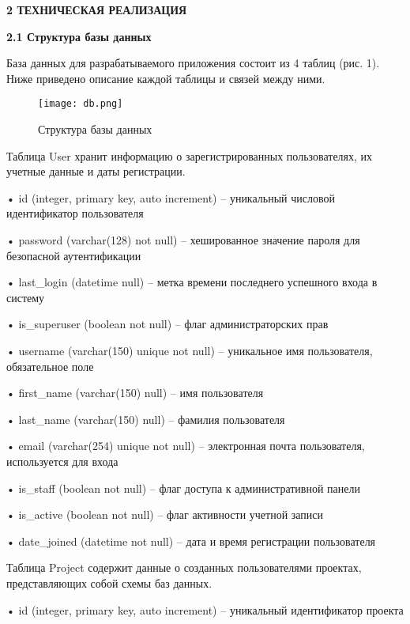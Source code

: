 \newpage
\begin{center}
  \textbf{\large 2 ТЕХНИЧЕСКАЯ РЕАЛИЗАЦИЯ}
\end{center}


\textbf{\large 2.1 Структура базы данных}

База данных для разрабатываемого приложения состоит из 4 таблиц (рис. 1). Ниже приведено описание каждой таблицы и связей между ними.

\renewcommand{\figurename}{Рисунок}
\begin{figure}[htbp]
    \centering %
    \texttt{[image: db.png]} 
    \caption{Структура базы данных}
    \label{fig:analyze} %
\end{figure}

Таблица User хранит информацию о зарегистрированных пользователях, их учетные данные и даты регистрации.

• id (integer, primary key, auto increment) – уникальный числовой идентификатор пользователя

• password (varchar(128) not null) – хешированное значение пароля для безопасной аутентификации

• last\_login (datetime null) – метка времени последнего успешного входа в систему

• is\_superuser (boolean not null) – флаг администраторских прав

• username (varchar(150) unique not null) – уникальное имя пользователя, обязательное поле

• first\_name (varchar(150) null) – имя пользователя

• last\_name (varchar(150) null) – фамилия пользователя

• email (varchar(254) unique not null) – электронная почта пользователя, используется для входа

• is\_staff (boolean not null) – флаг доступа к административной панели

• is\_active (boolean not null) – флаг активности учетной записи

• date\_joined (datetime not null) – дата и время регистрации пользователя


Таблица Project содержит данные о созданных пользователями проектах, представляющих собой схемы баз данных.

• id (integer, primary key, auto increment) – уникальный идентификатор проекта

